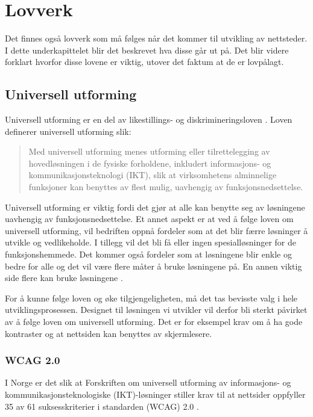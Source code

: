 \section{Lovverk}
Det finnes også lovverk som må følges når det kommer til utvikling av nettsteder. I dette underkapittelet blir det beskrevet hva disse går ut på. Det blir videre forklart hvorfor disse lovene er viktig, utover det faktum at de er lovpålagt. 

\subsection{Universell utforming}
\label{sec:universal-design}
Universell utforming er en del av likestillings- og diskrimineringsloven \cite{lovdata2018fou}. Loven definerer universell utforming slik:

\begin{quote}
    Med universell utforming menes utforming eller tilrettelegging av hovedløsningen i de fysiske forholdene, inkludert informasjons- og kommunikasjonsteknologi (IKT), slik at virksomhetens alminnelige funksjoner kan benyttes av flest mulig, uavhengig av funksjonsnedsettelse.
\end{quote}

Universell utforming er viktig fordi det gjør at alle kan benytte seg av løsningene uavhengig av funksjonsnedsettelse. Et annet aspekt er at ved å følge loven om universell utforming, vil bedriften oppnå fordeler som at det blir færre løsninger å utvikle og vedlikeholde. I tillegg vil det bli få eller ingen spesialløsninger for de funksjonshemmede. Det kommer også fordeler som at løsningene blir enkle og bedre for alle og det vil være flere måter å bruke løsningene på. En annen viktig side flere kan bruke løsningene \cite{difi2018keu}.

For å kunne følge loven og øke tilgjengeligheten, må det tas bevisste valg i hele utviklingsprosessen. Designet til løsningen vi utvikler vil derfor bli sterkt påvirket av å følge loven om universell utforming. Det er for eksempel krav om å ha gode kontraster og at nettsiden kan benyttes av skjermlesere. 


\subsubsection{WCAG 2.0}

I Norge er det slik at Forskriften om universell utforming av informasjons- og kommunikasjonsteknologiske (IKT)-løsninger \cite{lovdata2013fou} stiller krav til at nettsider oppfyller 35 av 61 suksesskriterier i standarden  (WCAG) 2.0 \cite{difi2018wca}. 

